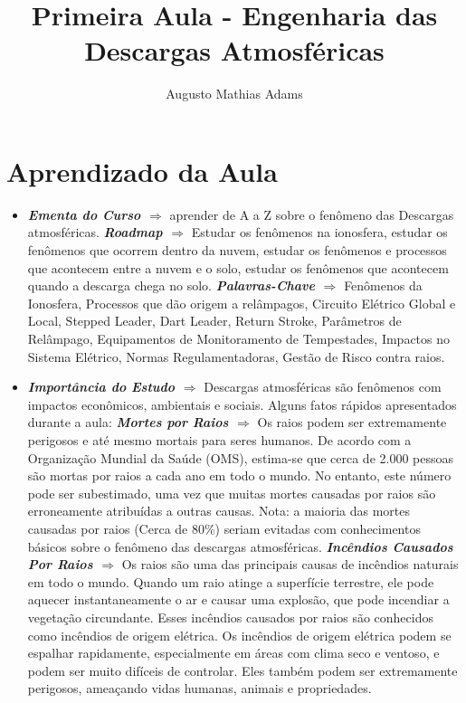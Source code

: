 \documentclass[a4paper, 12pt, onecolumn,singlespacing]{article}
\title{Primeira Aula - Engenharia das Descargas Atmosféricas}
\author[1]{Augusto Mathias Adams}
\affil[1]{augusto.adams@ufpr.br}
\begin{document}
	
	\maketitle
	
	\section{Aprendizado da Aula}
	
	\begin{itemize}
		\item \textbf{\textit{Ementa do Curso $\Rightarrow$ }} aprender de A a Z sobre o fenômeno das Descargas atmosféricas.
		\subitem \textbf{\textit{Roadmap $\Rightarrow$}} Estudar os fenômenos na ionosfera,  estudar os fenômenos que ocorrem dentro da nuvem, estudar os fenômenos e processos que acontecem entre a nuvem e o solo, estudar os fenômenos que acontecem quando a descarga chega no solo.
		\subitem \textbf{\textit{Palavras-Chave $\Rightarrow$ }} Fenômenos da Ionosfera, Processos que dão origem a relâmpagos, Circuito Elétrico Global e Local, Stepped Leader, Dart Leader, Return Stroke, Parâmetros de Relâmpago, Equipamentos de Monitoramento de Tempestades, Impactos no Sistema Elétrico, Normas Regulamentadoras, Gestão de Risco contra raios.
		\item \textbf{\textit{Importância do Estudo $\Rightarrow$ }} Descargas atmosféricas são fenômenos com impactos econômicos, ambientais e sociais. Alguns fatos rápidos apresentados durante a aula:
		\subitem \textbf{\textit{Mortes por Raios $\Rightarrow$}}  Os raios podem ser extremamente perigosos e até mesmo mortais para seres humanos. De acordo com a Organização Mundial da Saúde (OMS), estima-se que cerca de 2.000 pessoas são mortas por raios a cada ano em todo o mundo. No entanto, este número pode ser subestimado, uma vez que muitas mortes causadas por raios são erroneamente atribuídas a outras causas. Nota: a maioria das mortes causadas por raios (Cerca de 80\%) seriam evitadas com conhecimentos básicos sobre o fenômeno das descargas atmosféricas.
		\subitem \textbf{\textit{Incêndios Causados Por Raios $\Rightarrow$}} Os raios são uma das principais causas de incêndios naturais em todo o mundo. Quando um raio atinge a superfície terrestre, ele pode aquecer instantaneamente o ar e causar uma explosão, que pode incendiar a vegetação circundante. Esses incêndios causados por raios são conhecidos como incêndios de origem elétrica. Os incêndios de origem elétrica podem se espalhar rapidamente, especialmente em áreas com clima seco e ventoso, e podem ser muito difíceis de controlar. Eles também podem ser extremamente perigosos, ameaçando vidas humanas, animais e propriedades.

\end{itemize}
\end{document}
